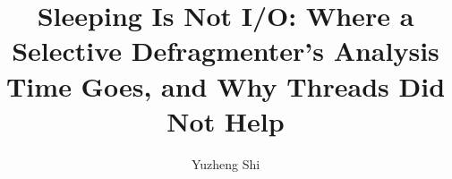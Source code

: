 \documentclass[sigconf,nonacm]{acmart}
\begin{document}
\title{Sleeping Is Not I/O: Where a Selective Defragmenter's Analysis Time Goes,
and Why Threads Did Not Help}

\author{Yuzheng Shi}



\maketitle















\appendix

\end{document}
